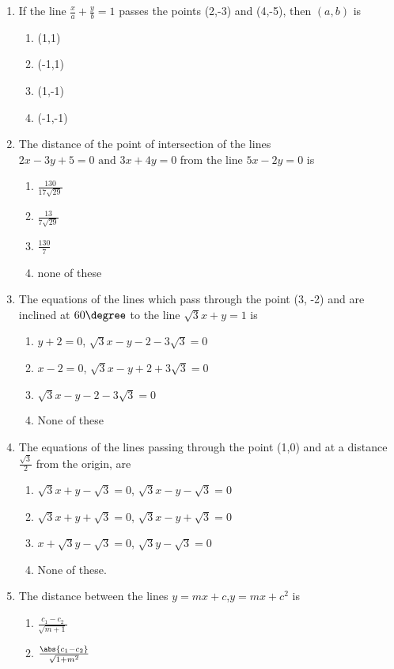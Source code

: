 \begin{enumerate}[resume]
\begin{enumerate}
\end{enumerate}
\item If the line $\frac{x}{a}+\frac{y}{b}=1$ passes the points (2,-3) and (4,-5), then $(a,b)$ is 
\begin{enumerate}
\item (1,1)
\item (-1,1)
\item (1,-1)
\item (-1,-1)
\end{enumerate}
\item The distance of the point of intersection of the lines $2x-3y+5=0 \text{ and }3x+4y=0$ from the line $5x-2y=0$ is
\begin{enumerate}
\item $\frac{130}{17\sqrt{29}}$
\item $\frac{13}{7\sqrt{29}}$
\item $\frac{130}{7}$
\item none of these
\end{enumerate}
\item The equations of the lines which pass through the point (3, -2) and are inclined at $60\degree$ to the line $\sqrt{3} x+y=1$ is
\begin{enumerate}
\item $y+2=0$, $\sqrt{3}x-y-2-3\sqrt{3}=0$
\item $x-2=0$, $\sqrt{3}x-y+2+3\sqrt{3}=0$
\item $\sqrt{3}x-y-2-3\sqrt{3}=0$
\item None of these
\end{enumerate}
\item The equations of the lines passing through the point (1,0) and at a distance $\frac{\sqrt{3}}{2}$ from the origin, are 
\begin{enumerate}
\item $\sqrt{3}x+y-\sqrt{3}=0$, $\sqrt{3}x-y-\sqrt{3}=0$
\item $\sqrt{3}x+y+\sqrt{3}=0$, $\sqrt{3}x-y+\sqrt{3}=0$
\item $x+\sqrt{3}y-\sqrt{3}=0$, $\sqrt{3}y-\sqrt{3}=0$
\item None of these.
\end{enumerate}
\item The distance between the lines $y=mx+c$,$y=mx+c^2$ is
\begin{enumerate}
\item $\frac{c_1-c_2}{\sqrt{m+1}}$
\item $\frac{\abs{c_1-c_2}}{\sqrt{1+m^2}}$

\end{enumerate}
\end{enumerate}
